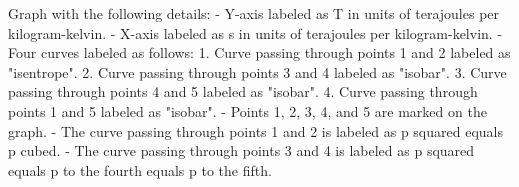 Graph with the following details:
- Y-axis labeled as T in units of terajoules per kilogram-kelvin.
- X-axis labeled as s in units of terajoules per kilogram-kelvin.
- Four curves labeled as follows:
  1. Curve passing through points 1 and 2 labeled as "isentrope".
  2. Curve passing through points 3 and 4 labeled as "isobar".
  3. Curve passing through points 4 and 5 labeled as "isobar".
  4. Curve passing through points 1 and 5 labeled as "isobar".
- Points 1, 2, 3, 4, and 5 are marked on the graph.
- The curve passing through points 1 and 2 is labeled as p squared equals p cubed.
- The curve passing through points 3 and 4 is labeled as p squared equals p to the fourth equals p to the fifth.